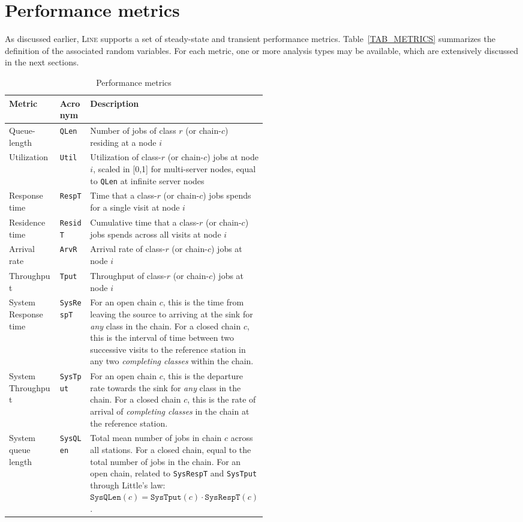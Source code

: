 \section{Performance metrics}
As discussed earlier, \textsc{Line} supports a set of steady-state and transient performance metrics. Table~\ref{TAB_METRICS} summarizes the definition of the associated random variables. For each metric, one or more analysis types may be available, which are extensively discussed in the next sections.
\begin{table}[thbp]
\centering
{\scriptsize
\renewcommand{\arraystretch}{1.2}
\caption{Performance metrics} %
\begin{tabular}{|l|l|p{0.5\linewidth}|}
\hline
\textbf{Metric} & \textbf{Acronym} & \textbf{Description} \\
\hline
Queue-length & \texttt{QLen}  & Number of jobs of class $r$ (or chain-$c$) residing at a node $i$\\
Utilization & \texttt{Util} & Utilization of class-$r$ (or chain-$c$) jobs at node $i$, scaled in [0,1] for multi-server nodes, equal to \texttt{QLen} at infinite server nodes\\
Response time & \texttt{RespT}  & Time that a class-$r$ (or chain-$c$) jobs spends for a single visit at node $i$\\
Residence time & \texttt{ResidT}  & Cumulative time that a class-$r$ (or chain-$c$) jobs spends across all visits at node $i$\\
Arrival rate & \texttt{ArvR} & Arrival rate of class-$r$ (or chain-$c$) jobs at node $i$\\
Throughput & \texttt{Tput} & Throughput of class-$r$ (or chain-$c$) jobs at node $i$\\
System Response time & \texttt{SysRespT}  & For an open chain $c$, this is the time from leaving the source to arriving at the sink for {\em any} class in the chain. For a closed chain $c$, this is the interval of time between two successive visits to the reference station in any two {\em completing classes} within the chain. \\
System Throughput & \texttt{SysTput} & For an open chain $c$, this is the departure rate towards the sink for {\em any} class in the chain. For a closed chain $c$, this is the rate of arrival of {\em completing classes} in the chain at the reference station. \\
System queue length & \texttt{SysQLen} & Total mean number of jobs in chain $c$ across all stations. For a closed chain, equal to the total number of jobs in the chain. For an open chain, related to \texttt{SysRespT} and \texttt{SysTput} through Little's law: $\mathtt{SysQLen}(c) = \mathtt{SysTput}(c) \cdot \mathtt{SysRespT}(c)$. \\

\end{tabular}}
\end{table}
